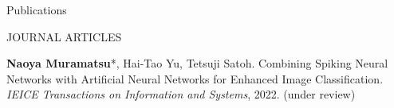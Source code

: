 \documentclass{resume} %
\begin{document}

\begin{rSection}{Publications} \itemsep 4pt


    \begin{rSubsection}{JOURNAL ARTICLES}{}{}{}{}
        \item \textbf{Naoya Muramatsu}*, Hai-Tao Yu, Tetsuji Satoh. Combining Spiking Neural Networks with Artificial Neural Networks for Enhanced Image Classification. \textit{IEICE Transactions on Information and Systems}, 2022. (under review)
    \end{rSubsection}


\end{rSection}
\end{document}
